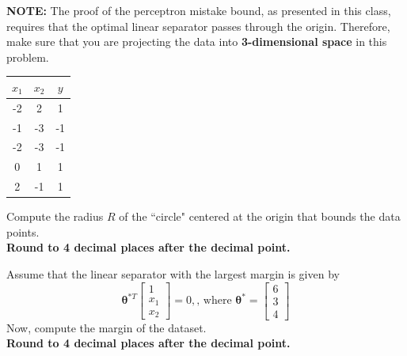 \documentclass[11pt,addpoints,answers]{exam}
\newcommand{\thetav     }{\boldsymbol \theta     }
\begin{document}
\begin{questions}
\begin{parts}
    \textbf{NOTE:} The proof of the perceptron mistake bound, as presented in this class, requires that the optimal linear separator passes through the origin. Therefore, make sure that you are projecting the data into \textbf{3-dimensional space} in this problem.    
    \begin{center}
    \begin{tabular}{||c c c||}
        \hline
         $x_1$ & $x_2$ & $y$ \\ [0.5ex]
        \hline\hline
        -2 & 2 & 1 \\
        \hline
        -1 & -3 & -1 \\
        \hline
        -2 & -3 & -1 \\
        \hline
        0 & 1 & 1 \\
        \hline
        2 & -1 & 1 \\
        \hline
    \end{tabular}
    \end{center}
    
    \begin{subparts}
        \subpart[2] Compute the radius $R$ of the ``circle" centered at the origin that bounds the data points. \\
        \textbf{Round to 4 decimal places after the decimal point.}
        
        \begin{your_solution}[title=Radius:,height=2cm,width=5cm]
        \end{your_solution}
 
        \subpart[2] Assume that the linear separator with the largest margin is given by \[\thetav^{*T}\begin{bmatrix}
        1 \\
        x_1 \\
        x_2 
        \end{bmatrix} = 0, \text{, where } \thetav^* = \begin{bmatrix}
        6 \\
        3 \\
        4 
        \end{bmatrix}
        \]
        Now, compute the margin of the dataset.\\
        \textbf{Round to 4 decimal places after the decimal point.}
        
        \begin{your_solution}[title=Margin:,height=2cm,width=5cm]
        \end{your_solution}
        

\end{subparts}
\end{parts}
\end{questions}
\end{document}
